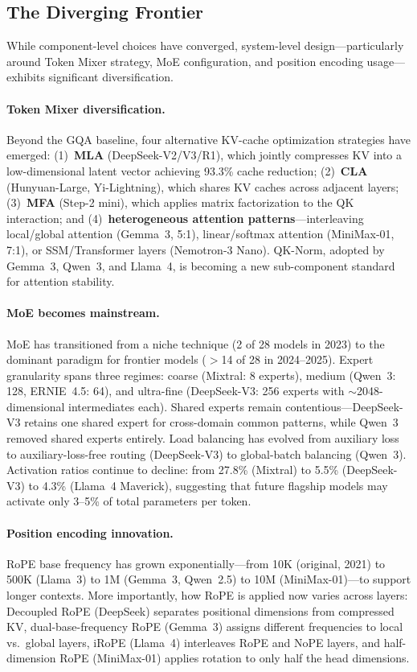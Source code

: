 \subsection{The Diverging Frontier}
\label{subsec:diverging_frontier}

While component-level choices have converged, system-level design---particularly around Token Mixer strategy, MoE configuration, and position encoding usage---exhibits significant diversification.

\paragraph{Token Mixer diversification.}
Beyond the GQA baseline, four alternative KV-cache optimization strategies have emerged: (1)~\textbf{MLA} (DeepSeek-V2/V3/R1), which jointly compresses KV into a low-dimensional latent vector achieving 93.3\% cache reduction; (2)~\textbf{CLA} (Hunyuan-Large, Yi-Lightning), which shares KV caches across adjacent layers; (3)~\textbf{MFA} (Step-2 mini), which applies matrix factorization to the QK interaction; and (4)~\textbf{heterogeneous attention patterns}---interleaving local/global attention (Gemma~3, 5:1), linear/softmax attention (MiniMax-01, 7:1), or SSM/Transformer layers (Nemotron-3 Nano). QK-Norm, adopted by Gemma~3, Qwen~3, and Llama~4, is becoming a new sub-component standard for attention stability.

\paragraph{MoE becomes mainstream.}
MoE has transitioned from a niche technique (2 of 28 models in 2023) to the dominant paradigm for frontier models ($>$14 of 28 in 2024--2025). Expert granularity spans three regimes: coarse (Mixtral: 8 experts), medium (Qwen~3: 128, ERNIE~4.5: 64), and ultra-fine (DeepSeek-V3: 256 experts with $\sim$2048-dimensional intermediates each). Shared experts remain contentious---DeepSeek-V3 retains one shared expert for cross-domain common patterns, while Qwen~3 removed shared experts entirely. Load balancing has evolved from auxiliary loss~\cite{fedus2022switch} to auxiliary-loss-free routing (DeepSeek-V3) to global-batch balancing (Qwen~3). Activation ratios continue to decline: from 27.8\% (Mixtral) to 5.5\% (DeepSeek-V3) to 4.3\% (Llama~4 Maverick), suggesting that future flagship models may activate only 3--5\% of total parameters per token.

\paragraph{Position encoding innovation.}
RoPE base frequency has grown exponentially---from 10K (original, 2021) to 500K (Llama~3) to 1M (Gemma~3, Qwen~2.5) to 10M (MiniMax-01)---to support longer contexts. More importantly, how RoPE is applied now varies across layers: Decoupled RoPE (DeepSeek) separates positional dimensions from compressed KV, dual-base-frequency RoPE (Gemma~3) assigns different frequencies to local vs.\ global layers, iRoPE (Llama~4) interleaves RoPE and NoPE layers, and half-dimension RoPE (MiniMax-01) applies rotation to only half the head dimensions.

